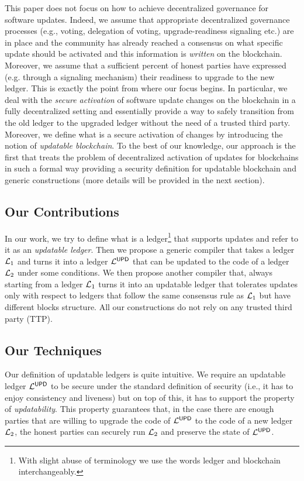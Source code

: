 This paper does not focus on how to achieve decentralized governance for 
software updates. Indeed, we assume that appropriate decentralized governance processes (e.g., voting, 
delegation of voting, upgrade-readiness signaling etc.) are in place and the 
community has already reached a consensus on what specific update should be activated and this information is \emph{written} on the blockchain. Moreover, we assume that 
a sufficient percent of honest parties have expressed (e.g. through a signaling 
mechanism) their readiness to upgrade to the new ledger. This is exactly the 
point from where our focus begins. In particular, we deal with the \emph{secure 
activation} of software update changes on the blockchain in a fully 
decentralized setting and essentially 
provide a way to safely transition from the old ledger to the upgraded ledger 
without the need of a trusted third party. Moreover, we define what is a secure 
activation of changes by introducing the notion of \emph{updatable blockchain}. 
To the best of our knowledge, our approach is the first that treats the problem 
of decentralized activation of updates for blockchains in such a formal way 
providing a security definition for updatable blockchain and generic 
constructions (more details will be provided in the next section).


\subsection{Our Contributions}
In our work, we try to define what is a ledger\footnote{With slight abuse of terminology we use the words 
ledger and blockchain interchangeably.} that supports updates and refer to it as an \emph{updatable ledger}.
Then we propose a generic compiler that takes a ledger $\mathcal{L}_1$ and turns it into a ledger $\mathcal{L}^\mathsf{UPD}$
that can be updated to the code of a ledger $\mathcal{L}_2$ under some conditions.
We then propose another compiler that, always starting from a ledger $\mathcal{L}_1$ turns it into an updatable ledger that tolerates updates only with respect to ledgers that follow the same consensus rule as $\mathcal{L}_1$ but have different blocks structure. All our constructions do not rely on any trusted third party (TTP).


\subsection{Our Techniques} Our definition of updatable ledgers is quite intuitive. We require
an updatable ledger $\mathcal{L}^\mathsf{UPD}$ to be secure under the standard definition of security (i.e., it has to enjoy consistency and liveness) but on top of this, it has to support the property of \emph{updatability}. 
This property guarantees that, in the case there are  enough parties that are willing to upgrade 
the code of $\mathcal{L}^\mathsf{UPD}$ to the code of a new ledger $\mathcal{L}_2$, the honest parties can securely run $\mathcal{L}_2$
and preserve the state of $\mathcal{L}^\mathsf{UPD}$.

